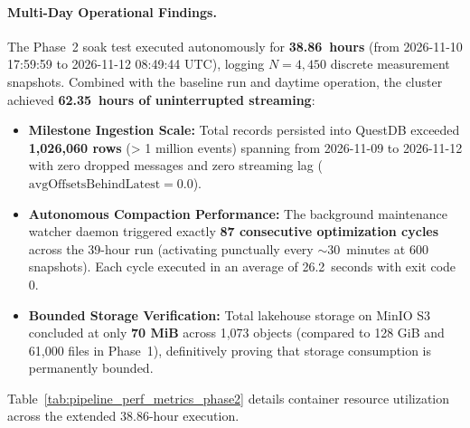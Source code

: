 \paragraph{Multi-Day Operational Findings.}
The Phase~2 soak test executed autonomously for \textbf{38.86~hours} (from 2026-11-10 17:59:59 to 2026-11-12 08:49:44 UTC), logging $N = 4,450$ discrete measurement snapshots. Combined with the baseline run and daytime operation, the cluster achieved \textbf{62.35~hours of uninterrupted streaming}:
\begin{itemize}
    \item \textbf{Milestone Ingestion Scale:} Total records persisted into QuestDB exceeded \textbf{1,026,060 rows} (> 1 million events) spanning from 2026-11-09 to 2026-11-12 with zero dropped messages and zero streaming lag ($\text{avgOffsetsBehindLatest} = 0.0$).
    \item \textbf{Autonomous Compaction Performance:} The background maintenance watcher daemon triggered exactly \textbf{87 consecutive optimization cycles} across the 39-hour run (activating punctually every $\sim30$~minutes at 600 snapshots). Each cycle executed in an average of 26.2~seconds with exit code 0.
    \item \textbf{Bounded Storage Verification:} Total lakehouse storage on MinIO S3 concluded at only \textbf{70 MiB} across 1,073 objects (compared to 128 GiB and 61,000 files in Phase~1), definitively proving that storage consumption is permanently bounded.
\end{itemize}

Table~\ref{tab:pipeline_perf_metrics_phase2} details container resource utilization across the extended 38.86-hour execution.

